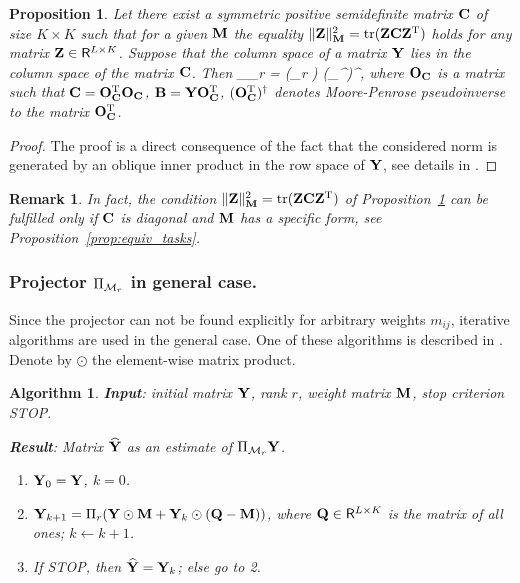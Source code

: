\documentclass[sii]{ipart}
\DeclareMathOperator{\tr}{tr}
\newtheorem{proposition}{Proposition}
\newtheorem{algorithm}{Algorithm}
\newtheorem{remark}{Remark}
\begin{document}
\begin{proposition}
	\label{prop:projS}
	Let there exist a symmetric positive semidefinite matrix $\mathbf{C}$ of size $K \times K$ such that for a given $\mathbf{M}$ the  equality $\|\bfZ\|_\bfM^2 = \tr(\bfZ \bfC \bfZ^\rmT)$ holds for any matrix $\mathbf{Z}\in \mathsf{R}^{L\times K}$.
	Suppose that the column space of a matrix $\mathbf{Y}$ lies in the column space of the matrix $\mathbf{C}$.
	Then
	\be
	\label{eq:PiMr}
	\Pi_{\calM_r} \bfY = (\Pi_r \bfB) (\bfO_\bfC^{\rmT})^\dagger,
	\ee
	where $\mathbf{O}_{\mathbf{C}}$ is a matrix such that $\mathbf{C} = \mathbf{O}_{\mathbf{C}}^{\mathrm{T}}\mathbf{O}_{\mathbf{C}}$,
	$\mathbf{B} = \mathbf{Y} \mathbf{O}_{\mathbf{C}}^{\mathrm{T}}$, $(\mathbf{O}_{\mathbf{C}}^{\mathrm{T}})^\dagger$ denotes  Moore-Penrose pseudoinverse to the matrix $\mathbf{O}_{\mathbf{C}}^{\mathrm{T}}$.
\end{proposition}
\begin{proof}
	The proof is a direct consequence of the fact that the considered norm is generated by an oblique inner product in the row space of $\mathbf{Y}$, see details in \cite{Golyandina2013}.
\end{proof}

\begin{remark}
\label{rem:diagC}
	In fact, the condition $\|\bfZ\|_\bfM^2 = \tr(\bfZ \bfC \bfZ^\rmT)$ of Proposition~\ref{prop:projS} can be fulfilled only if $\mathbf{C}$ is diagonal and $\mathbf{M}$ has a specific form, see Proposition~\ref{prop:equiv_tasks}.
\end{remark}

\subsubsection{Projector $\Pi_{\mathcal{M}_r}$ in general case.}
Since the projector can not be found explicitly for arbitrary weights $m_{ij}$, iterative algorithms are used in the general case.
One of these algorithms is described in \cite{Srebro2003}. Denote by $\odot$ the element-wise matrix product.

\begin{algorithm}
	\label{alg:weightedSVD}
	\textbf{Input}: initial matrix $\mathbf{Y}$, rank $r$, weight matrix $\mathbf{M}$,
	stop criterion STOP.
	
	\textbf{Result}:
	Matrix $\widehat{\mathbf{Y}}$ as an estimate of $\Pi_{\mathcal{M}_r} \mathbf{Y}$.
	
	\begin{enumerate}
		\item
		$\mathbf{Y}_0 = \mathbf{Y}$, $k=0$.
		\item
		$\mathbf{Y}_{k+1} = \Pi_r(\mathbf{Y} \odot \mathbf{M} + \mathbf{Y}_{k} \odot (\mathbf{Q} -  \mathbf{M}))$, where
		$\mathbf{Q} \in \mathsf{R}^{L \times K}$ is the matrix of all ones;
        \quad $k\leftarrow k+1$.
		\item
		If STOP, then $\widehat{\mathbf{Y}} = \mathbf{Y}_k$; else go to 2.
	\end{enumerate}
\end{algorithm}
\end{document}

